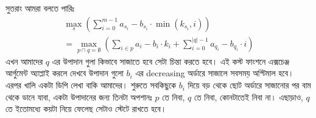 \begin{exercise}
\begin{hint}
\noindent সুতরাং আমরা বলতে পারিঃ
\begin{gather*}
  \max_{s} \left ( \sum_{i=0}^{m-1} a_{s_i} - b_{s_i} \cdot \min(k_{s_i}, i) \right )\\
  = \max_{p \cap q = \emptyset} \left ( \sum_{i \in p} a_i - b_i \cdot k_i + \sum_{i=0}^{|q|-1} a_{q_i} - b_{q_i} \cdot i \right )
\end{gather*}
এখন আমাদের $q$ এর উপাদান গুলা কিভাবে সাজাতে হবে সেটা চিন্তা করতে হবে। এই কস্ট ফাংশনে এক্সচেঞ্জ আর্গুমেন্ট অ্যাপ্লাই করলে দেখবে উপাদান গুলো $b_i$ এর decreasing অর্ডারে সাজালে সবসময় অপ্টিমাল হবে। এরপর খালি একটা ডিপি লেখা বাকি আমাদের। শুরুতে সবকিছুকে $b_i$ দিয়ে বড় থেকে ছোট অর্ডারে সাজানোর পর বাম থেকে ডানে যাবা, একটা উপাদানের জন্য তিনটা অপশানঃ $p$ তে নিবা, $q$ তে নিবা, কোনটাতেই নিবা না। এছাড়াও, $q$ তে ইতোমধ্যে কয়টা নিয়ে ফেলেছ সেটাও স্টেটে রাখতে হবে।
\end{hint}
\end{exercise}
